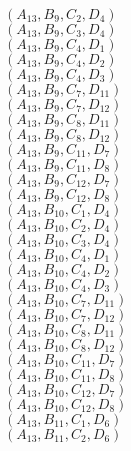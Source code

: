 \documentclass[14pt]{article}
\begin{document}
    $({A}_{13}, {B}_{9}, {C}_{2}, {D}_{4}) $ \\ 
    $({A}_{13}, {B}_{9}, {C}_{3}, {D}_{4}) $ \\ 
    $({A}_{13}, {B}_{9}, {C}_{4}, {D}_{1}) $ \\ 
    $({A}_{13}, {B}_{9}, {C}_{4}, {D}_{2}) $ \\ 
    $({A}_{13}, {B}_{9}, {C}_{4}, {D}_{3}) $ \\ 
    $({A}_{13}, {B}_{9}, {C}_{7}, {D}_{11}) $ \\ 
    $({A}_{13}, {B}_{9}, {C}_{7}, {D}_{12}) $ \\ 
    $({A}_{13}, {B}_{9}, {C}_{8}, {D}_{11}) $ \\ 
    $({A}_{13}, {B}_{9}, {C}_{8}, {D}_{12}) $ \\ 
    $({A}_{13}, {B}_{9}, {C}_{11}, {D}_{7}) $ \\ 
    $({A}_{13}, {B}_{9}, {C}_{11}, {D}_{8}) $ \\ 
    $({A}_{13}, {B}_{9}, {C}_{12}, {D}_{7}) $ \\ 
    $({A}_{13}, {B}_{9}, {C}_{12}, {D}_{8}) $ \\ 
    $({A}_{13}, {B}_{10}, {C}_{1}, {D}_{4}) $ \\ 
    $({A}_{13}, {B}_{10}, {C}_{2}, {D}_{4}) $ \\ 
    $({A}_{13}, {B}_{10}, {C}_{3}, {D}_{4}) $ \\ 
    $({A}_{13}, {B}_{10}, {C}_{4}, {D}_{1}) $ \\ 
    $({A}_{13}, {B}_{10}, {C}_{4}, {D}_{2}) $ \\ 
    $({A}_{13}, {B}_{10}, {C}_{4}, {D}_{3}) $ \\ 
    $({A}_{13}, {B}_{10}, {C}_{7}, {D}_{11}) $ \\ 
    $({A}_{13}, {B}_{10}, {C}_{7}, {D}_{12}) $ \\ 
    $({A}_{13}, {B}_{10}, {C}_{8}, {D}_{11}) $ \\ 
    $({A}_{13}, {B}_{10}, {C}_{8}, {D}_{12}) $ \\ 
    $({A}_{13}, {B}_{10}, {C}_{11}, {D}_{7}) $ \\ 
    $({A}_{13}, {B}_{10}, {C}_{11}, {D}_{8}) $ \\ 
    $({A}_{13}, {B}_{10}, {C}_{12}, {D}_{7}) $ \\ 
    $({A}_{13}, {B}_{10}, {C}_{12}, {D}_{8}) $ \\ 
    $({A}_{13}, {B}_{11}, {C}_{1}, {D}_{6}) $ \\ 
    $({A}_{13}, {B}_{11}, {C}_{2}, {D}_{6}) $ \\ 
\end{document}
